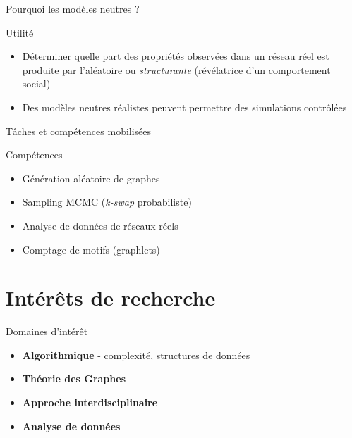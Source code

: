 \documentclass[aspectratio=169, 12pt]{beamer}
\newcommand{\kswap}{\textit{k-swap}}
\newcommand{\highlight}[1]{\textbf{\textcolor{LIP6teal}{#1}}}
\begin{document}
\begin{frame}{Pourquoi les modèles neutres ?}
      \begin{alertblock}{Utilité}
      \begin{itemize}      
        \item[\(\rightarrow\)] Déterminer quelle part des propriétés observées dans un réseau réel
        est produite par l'aléatoire ou
        \emph{structurante} (révélatrice d'un comportement social)
        \item[\(\rightarrow\)] Des modèles neutres réalistes peuvent permettre des simulations contrôlées
    \end{itemize}
      \end{alertblock}
\end{frame}



\begin{frame}{Tâches et compétences mobilisées}

      \begin{block}{Compétences}
        \begin{itemize}
          \item Génération aléatoire de graphes
          \item Sampling MCMC (\kswap{} probabiliste)
          \item Analyse de données de réseaux réels
          \item Comptage de motifs (graphlets)
        \end{itemize}
      \end{block}

\end{frame}

\section{Intérêts de recherche}

\begin{frame}{Domaines d'intérêt}

      \begin{itemize}
        \setlength\itemsep{8pt}
        \item \highlight{Algorithmique} - complexité, structures de données
        \item \highlight{Théorie des Graphes}
        \item \highlight{Approche interdisciplinaire} 
        \item \highlight{Analyse de données}
      \end{itemize}

\end{frame}
\end{document}
